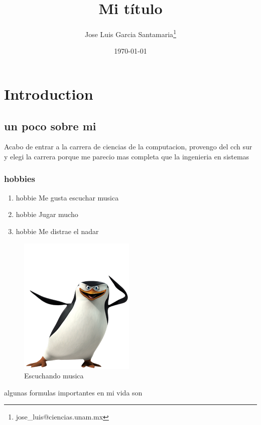\documentclass{book}
\author{Jose Luis Garcia Santamaria\thanks{jose\_luis@ciencias.unam.mx}}
\title{Mi título}
\date{\today}
\begin{document}
\maketitle
\tableofcontents
{}

\listoffigures
{}

\listoftables
{}

\chapter{Introduction}

\section{un poco sobre mi}
Acabo de entrar a la carrera de ciencias de la computacion, provengo del cch sur y elegi la carrera porque me parecio mas completa que la ingenieria en sistemas 

\subsection{hobbies}
\begin{enumerate}
\item hobbie Me gusta escuchar musica
\item hobbie Jugar mucho
\item hobbie Me distrae el nadar 
\end{enumerate}

\begin{figure}[h]
  \centering
  \includegraphics[scale=0.5]{IMG/17.png}
  \caption{Escuchando musica}
\end{figure}

\newpage
algunas formulas importantes en mi vida son
\end{document}
